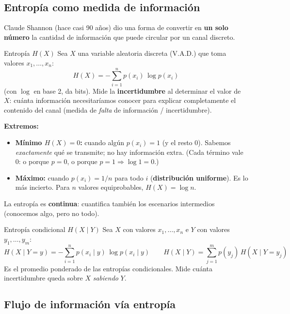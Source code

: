 \documentclass[../main.tex]{subfiles}
\begin{document}
\subsection{Entropía como medida de información}

Claude Shannon (hace casi 90 años) dio una forma de convertir en \textbf{un solo
número} la cantidad de información que puede circular por un canal discreto.

\begin{definicion}{Entropía $H(X)$}
Sea $X$ una variable aleatoria discreta (V.A.D.) que toma valores $x_1,\dots,x_n$:
\[
H(X) = -\sum_{i=1}^{n} p(x_i)\,\log p(x_i)
\]
(con $\log$ en base 2, da bits). Mide la \textbf{incertidumbre} al determinar el
valor de $X$: cuánta información necesitaríamos conocer para explicar completamente
el contenido del canal (medida de \emph{falta} de información / incertidumbre).
\end{definicion}

\textbf{Extremos:}
\begin{itemize}[noitemsep]
  \item \textbf{Mínimo $H(X)=0$:} cuando algún $p(x_i)=1$ (y el resto $0$). Sabemos
        \emph{exactamente} qué se transmite; no hay información extra. (Cada término
        vale 0: o porque $p=0$, o porque $p=1 \Rightarrow \log 1 = 0$.)
  \item \textbf{Máximo:} cuando $p(x_i)=1/n$ para todo $i$ (\textbf{distribución
        uniforme}). Es lo más incierto. Para $n$ valores equiprobables,
        $H(X)=\log n$.
\end{itemize}
La entropía es \textbf{continua}: cuantifica también los escenarios intermedios
(conocemos algo, pero no todo).

\begin{definicion}{Entropía condicional $H(X\mid Y)$}
Sea $X$ con valores $x_1,\dots,x_n$ e $Y$ con valores $y_1,\dots,y_m$:
\[
H(X\mid Y=y) = -\sum_{i=1}^{n} p(x_i\mid y)\,\log p(x_i\mid y)
\qquad
H(X\mid Y) = \sum_{j=1}^{m} p(y_j)\,H(X\mid Y=y_j)
\]
Es el promedio ponderado de las entropías condicionales. Mide cuánta
incertidumbre queda sobre $X$ \emph{sabiendo} $Y$.
\end{definicion}

\subsection{Flujo de información vía entropía}
\end{document}
